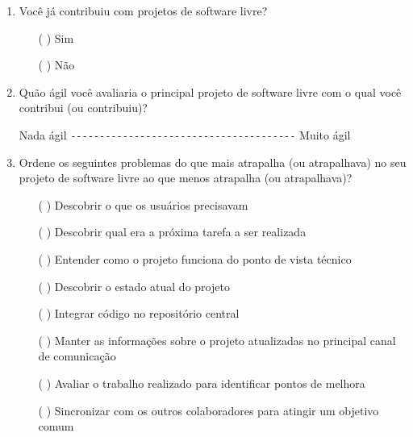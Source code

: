 \begin{enumerate}
\item Você já contribuiu com projetos de software livre?
  \begin{itemize}
  \item[( )] Sim
  \item[( )] Não
  \end{itemize}

\item Quão ágil você avaliaria o principal projeto de software livre
  com o qual você contribui (ou contribuiu)?

  Nada ágil \verb=---------------------------------------= Muito ágil

\item Ordene os seguintes problemas do que mais atrapalha (ou
  atrapalhava) no seu projeto de software livre ao que menos atrapalha
  (ou atrapalhava)?
  \begin{itemize}
  \item[( )] Descobrir o que os usuários precisavam
  \item[( )] Descobrir qual era a próxima tarefa a ser realizada
  \item[( )] Entender como o projeto funciona do ponto de vista
    técnico
  \item[( )] Descobrir o estado atual do projeto
  \item[( )] Integrar código no repositório central
  \item[( )] Manter as informações sobre o projeto atualizadas no
    principal canal de comunicação
  \item[( )] Avaliar o trabalho realizado para identificar pontos de
    melhora
  \item[( )] Sincronizar com os outros colaboradores para atingir um
    objetivo comum
  \end{itemize}


\end{enumerate}
